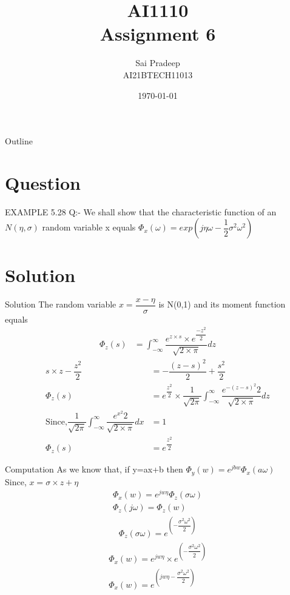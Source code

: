 \documentclass{beamer}
\title{AI1110 \\ Assignment 6}
\author{Sai Pradeep \\ AI21BTECH11013}
\date{\today}
\begin{document}
	\begin{frame}
		\titlepage
	\end{frame}
	\begin{frame}{Outline}
		\tableofcontents
	\end{frame}
	\section{Question}
	\begin{frame}{EXAMPLE 5.28}
Q:-	 We shall show that the characteristic function of an $N(\eta,\sigma)$ random variable x equals $\Phi_x(\omega)=exp(j  \eta  \omega-\dfrac{1}{2}  \sigma^2  \omega^2)$
\end{frame}
	
	\section{Solution}
	\begin{frame}{Solution}
The random variable $x=\dfrac{x-\eta}{\sigma}$ is N(0,1) and its moment function equals 
\begin{align}
\Phi_z (s)&=\int_{-\infty}^{\infty}\dfrac{e^{z \times s} \times e^{\dfrac{-z^2}{2}}}{\sqrt{2 \times \pi }}dz
\end{align}
\begin{align}
s \times z-\dfrac{z^2}{2}&=-\dfrac{(z-s)^2}{2}+\dfrac{s^2}{2}  \\
\Phi_z (s)&=e^{\dfrac{z^2}{2}} \times \dfrac{1}{\sqrt{2\pi}} 
\int_{-\infty}^{\infty}\dfrac{e^{-(z-s)^2}{2}}{\sqrt{2 \times \pi }}dz  \\
\text{Since,} \dfrac{1}{\sqrt{2\pi}} 
\int_{-\infty}^{\infty}\dfrac{e^{x^2}{2}}{\sqrt{2 \times \pi }}dx &=1\\
\label{eq:5}
\Phi_z (s)&=e^{\dfrac{z^2}{2}}
\end{align}
\end{frame}
\begin{frame}{Computation}
As we know that, if y=ax+b then $\Phi_y (w)=e^{jbw} \Phi_x (a \omega)$\\
Since, $x=\sigma \times z + \eta$ \\
\begin{align}
\label{eq:6}
\Phi_x (w)=e^{jw \eta} \Phi_z (\sigma \omega)\\
\Phi_z(j \omega )=\Phi_z(w)
\end{align}
\begin{align}
\label{eq:8}
\Phi_z (\sigma \omega)=e^(- \dfrac{\sigma^2 \omega^2}{2})
\end{align}
\begin{align}
\Phi_x (w)=e^{jw \eta} \times e^(- \dfrac{\sigma^2 \omega^2}{2})\\
\Phi_x (w)=e^(jw \eta - \dfrac{\sigma^2 \omega^2}{2})
\end{align}
\end{frame}
\end{document}
